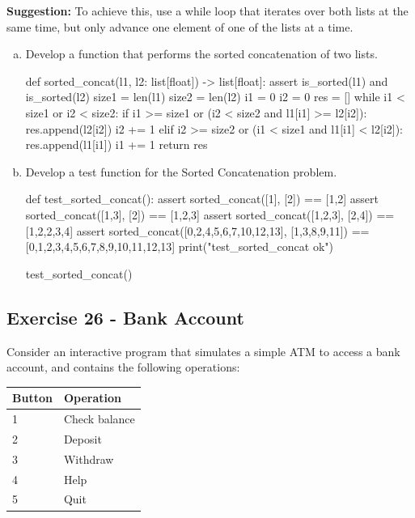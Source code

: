 \documentclass[12pt]{article}
\begin{document}
\noindent \textbf{Suggestion:} To achieve this, use a while loop that iterates 
over both lists at the same time, but only advance one element of one of the 
lists at a time.
\begin{enumerate}[a)]
  \item Develop a function that performs the sorted concatenation of two lists.
\newpage
\begin{pythonlst}
def sorted_concat(l1, l2: list[float]) -> list[float]:
  assert is_sorted(l1) and is_sorted(l2)
  size1 = len(l1)
  size2 = len(l2)
  i1 = 0
  i2 = 0
  res = []
  while i1 < size1 or i2 < size2:
    if i1 >= size1 or (i2 < size2 and l1[i1] >= l2[i2]):
      res.append(l2[i2])
      i2 += 1
    elif i2 >= size2 or (i1 < size1 and l1[i1] < l2[i2]):
      res.append(l1[i1])
      i1 += 1
  return res
\end{pythonlst}
\vspace{-4mm}
  \item Develop a test function for the Sorted Concatenation problem.
\begin{pythonlst}
def test_sorted_concat():
  assert sorted_concat([1], [2]) == [1,2]
  assert sorted_concat([1,3], [2]) == [1,2,3]
  assert sorted_concat([1,2,3], [2,4]) == [1,2,2,3,4]
  assert sorted_concat([0,2,4,5,6,7,10,12,13], [1,3,8,9,11]) == [0,1,2,3,4,5,6,7,8,9,10,11,12,13] 
  print("test_sorted_concat ok")

test_sorted_concat()
\end{pythonlst}
\vspace{-4mm}
\end{enumerate}

\subsection*{Exercise 26 - Bank Account}
Consider an interactive program that simulates a simple ATM to access a bank 
account, and contains the following operations:
\begin{table}[!ht]
  \begin{center}
      \begin{tabular}{ | m{7em} | m{7em} | }
          \hline
          Button & Operation       \\
          \hline
          1      & Check balance   \\
          \hline
          2      & Deposit         \\
          \hline
          3      & Withdraw        \\
          \hline
          4      & Help            \\
          \hline
          5      & Quit            \\
          \hline
      \end{tabular}
  \end{center}
\end{table} 
\end{document}

